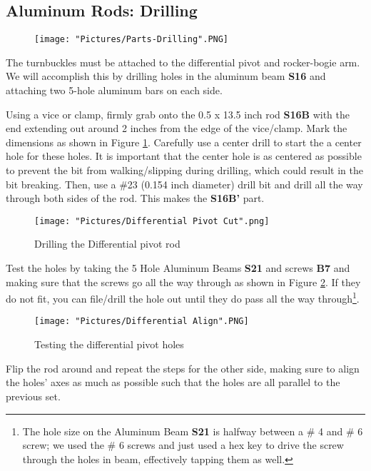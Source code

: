 \documentclass[12pt]{article}
\begin{document}
\subsection{Aluminum Rods: Drilling}

\begin{figure}[H]
	\centering
	\texttt{[image: "Pictures/Parts-Drilling".PNG]}
\end{figure}

The turnbuckles must be attached to the differential pivot and rocker-bogie arm. We will accomplish this by drilling holes in the aluminum beam \textbf{S16} and attaching two 5-hole aluminum bars on each side. 

Using a vice or clamp, firmly grab onto the 0.5 x 13.5 inch rod \textbf{S16B} with the end extending out around 2 inches from the edge of the vice/clamp. Mark the dimensions as shown in Figure \ref{diff pivot rod}. Carefully use a center drill to start the a center hole for these holes. It is important that the center hole is as centered as possible to prevent the bit from walking/slipping during drilling, which could result in the bit breaking. Then, use a \#23 (0.154 inch diameter) drill bit and drill all the way through both sides of the rod. This makes the \textbf{S16B'} part. 

\begin{figure}[H]
\centering	
  \texttt{[image: "Pictures/Differential Pivot Cut".png]}
	\caption{Drilling the Differential pivot rod}
	\label{diff pivot rod}
\end{figure}


Test the holes by taking the 5 Hole Aluminum Beams \textbf{S21} and screws \textbf{B7} and making sure that the screws go all the way through as shown in Figure \ref{test}. If they do not fit, you can file/drill the hole out until they do pass all the way through\footnote{The hole size on the Aluminum Beam \textbf{S21} is halfway between a \# 4 and \# 6 screw; we used the \# 6 screws and just used a hex key to drive the screw through the holes in beam, effectively tapping them as well.}. 

\begin{figure}[H]
	\centering
	\texttt{[image: "Pictures/Differential Align".PNG]}
	\caption{Testing the differential pivot holes}
	\label{test}
\end{figure}

\noindent Flip the rod around and repeat the steps for the other side, making sure to align the holes' axes as much as possible such that the holes are all parallel to the previous set.
\end{document}
